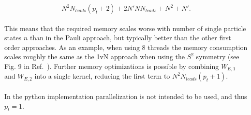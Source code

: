 \documentclass{article}
\begin{document}
\begin{equation}
    N^2  N_{leads} (p_t + 2 ) + 2N'N N_{leads} + N^2 + N'.
\end{equation}
\\
This means that the required memory scales worse with number of single particle states $n$ than in the Pauli approach, but typically better than the other first order approaches. As an example, when using 8 threads the memory consumption scales roughly the same as the 1vN approach when using the $S^2$ symmetry (see Fig. 9 in Ref.~\cite{kirvsanskas2017qmeq}). Further memory optimizations is possible by combining $W_{E,1}$ and $W_{E,2}$ into a single kernel, reducing the first term to $ N^2  N_{leads} (p_t + 1 ) $.
\\
\\
In the python implementation parallelization is not intended to be used, and thus $p_t=1$. 


\end{document}
